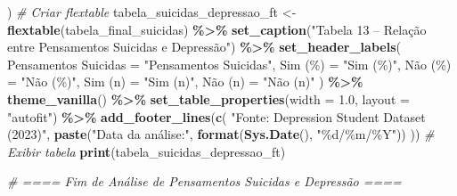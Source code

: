 \documentclass[
]{article}
\newenvironment{Shaded}{\begin{snugshade}}{\end{snugshade}}
\newcommand{\AttributeTok}[1]{\textcolor[rgb]{0.13,0.29,0.53}{#1}}
\newcommand{\CommentTok}[1]{\textcolor[rgb]{0.56,0.35,0.01}{\textit{#1}}}
\newcommand{\FloatTok}[1]{\textcolor[rgb]{0.00,0.00,0.81}{#1}}
\newcommand{\FunctionTok}[1]{\textcolor[rgb]{0.13,0.29,0.53}{\textbf{#1}}}
\newcommand{\NormalTok}[1]{#1}
\newcommand{\OtherTok}[1]{\textcolor[rgb]{0.56,0.35,0.01}{#1}}
\newcommand{\SpecialCharTok}[1]{\textcolor[rgb]{0.81,0.36,0.00}{\textbf{#1}}}
\newcommand{\StringTok}[1]{\textcolor[rgb]{0.31,0.60,0.02}{#1}}
\begin{document}
\begin{Shaded}
\begin{Highlighting}[]
\NormalTok{  )}
\CommentTok{\# Criar flextable}
\NormalTok{tabela\_suicidas\_depressao\_ft }\OtherTok{\textless{}{-}} \FunctionTok{flextable}\NormalTok{(tabela\_final\_suicidas) }\SpecialCharTok{\%\textgreater{}\%}
  \FunctionTok{set\_caption}\NormalTok{(}\StringTok{"Tabela 13 – Relação entre Pensamentos Suicidas e Depressão"}\NormalTok{) }\SpecialCharTok{\%\textgreater{}\%}
  \FunctionTok{set\_header\_labels}\NormalTok{(}
    \StringTok{\textasciigrave{}}\AttributeTok{Pensamentos Suicidas}\StringTok{\textasciigrave{}} \OtherTok{=} \StringTok{"Pensamentos Suicidas"}\NormalTok{,}
    \StringTok{\textasciigrave{}}\AttributeTok{Sim (\%)}\StringTok{\textasciigrave{}} \OtherTok{=} \StringTok{"Sim (\%)"}\NormalTok{,}
    \StringTok{\textasciigrave{}}\AttributeTok{Não (\%)}\StringTok{\textasciigrave{}} \OtherTok{=} \StringTok{"Não (\%)"}\NormalTok{,}
    \StringTok{\textasciigrave{}}\AttributeTok{Sim (n)}\StringTok{\textasciigrave{}} \OtherTok{=} \StringTok{"Sim (n)"}\NormalTok{,}
    \StringTok{\textasciigrave{}}\AttributeTok{Não (n)}\StringTok{\textasciigrave{}} \OtherTok{=} \StringTok{"Não (n)"}
\NormalTok{  ) }\SpecialCharTok{\%\textgreater{}\%}
  \FunctionTok{theme\_vanilla}\NormalTok{() }\SpecialCharTok{\%\textgreater{}\%}
  \FunctionTok{set\_table\_properties}\NormalTok{(}\AttributeTok{width =} \FloatTok{1.0}\NormalTok{, }\AttributeTok{layout =} \StringTok{"autofit"}\NormalTok{) }\SpecialCharTok{\%\textgreater{}\%}
  \FunctionTok{add\_footer\_lines}\NormalTok{(}\FunctionTok{c}\NormalTok{(}
    \StringTok{"Fonte: Depression Student Dataset (2023)"}\NormalTok{,}
    \FunctionTok{paste}\NormalTok{(}\StringTok{"Data da análise:"}\NormalTok{, }\FunctionTok{format}\NormalTok{(}\FunctionTok{Sys.Date}\NormalTok{(), }\StringTok{"\%d/\%m/\%Y"}\NormalTok{))}
\NormalTok{  ))}
\CommentTok{\# Exibir tabela}
\FunctionTok{print}\NormalTok{(tabela\_suicidas\_depressao\_ft)}


\CommentTok{\# ==== Fim de Análise de Pensamentos Suicidas e Depressão ====}


\end{Highlighting}
\end{Shaded}
\end{document}
